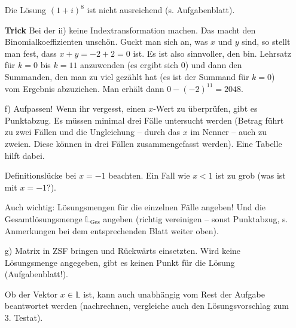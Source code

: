 \documentclass[11pt, a4paper]{article}
\newcommand{\Lsg}{\mathbb{L}}
\begin{document}
\begin{itemize}
Die Lösung $(1+i)^8$ ist nicht ausreichend (s. Aufgabenblatt).

\textbf{Trick} Bei der ii) keine Indextransformation machen. Das macht den Binomialkoeffizienten unschön. Guckt man sich an, was $x$ und $y$ sind, so stellt man fest, dass $x + y = -2 + 2 = 0$ ist. Es ist also sinnvoller, den bin. Lehrsatz für $k=0$ bis $k = 11$ anzuwenden (es ergibt sich $0$) und dann den Summanden, den man zu viel gezählt hat (es ist der Summand für $k = 0$) vom Ergebnis abzuziehen. Man erhält dann $0 - (-2)^{11} = 2048$.

\item[f)] Aufpassen! Wenn ihr vergesst, einen $x$-Wert zu überprüfen, gibt es Punktabzug. Es müssen minimal drei Fälle untersucht werden (Betrag führt zu zwei Fällen und die Ungleichung -- durch das $x$ im Nenner --  auch zu zweien. Diese können in drei Fällen zusammengefasst werden). Eine Tabelle hilft dabei. 

Definitionslücke bei $x = -1$ beachten. Ein Fall wie $x < 1$ ist zu grob (was ist mit $x = -1$?).

Auch wichtig: Lösungsmengen für die einzelnen Fälle angeben! Und die Gesamtlösungsmenge $\Lsg_{\text{Ges}}$ angeben (richtig vereinigen -- sonst Punktabzug, s. Anmerkungen bei dem entsprechenden Blatt weiter oben).

\item[g)] Matrix in ZSF bringen und Rückwärts einsetzten. Wird keine Lösungsmenge angegeben, gibt es keinen Punkt für die Lösung (Aufgabenblatt!). 

Ob der Vektor $x \in \Lsg$ ist, kann auch unabhängig vom Rest der Aufgabe beantwortet werden (nachrechnen, vergleiche auch den Lösungsvorschlag zum 3. Testat).
\end{itemize}
\end{document}
